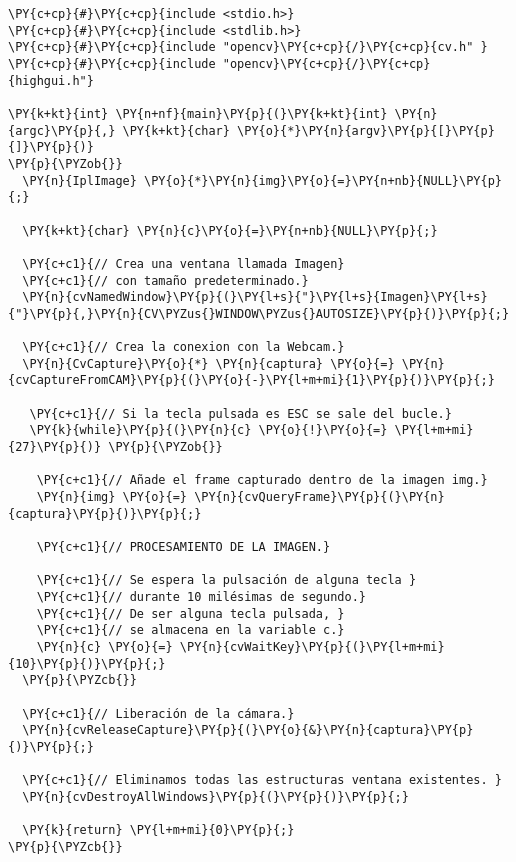 \begin{Verbatim}[commandchars=\\\{\}]
\PY{c+cp}{#}\PY{c+cp}{include <stdio.h>}
\PY{c+cp}{#}\PY{c+cp}{include <stdlib.h>}
\PY{c+cp}{#}\PY{c+cp}{include "opencv}\PY{c+cp}{/}\PY{c+cp}{cv.h" }
\PY{c+cp}{#}\PY{c+cp}{include "opencv}\PY{c+cp}{/}\PY{c+cp}{highgui.h"}

\PY{k+kt}{int} \PY{n+nf}{main}\PY{p}{(}\PY{k+kt}{int} \PY{n}{argc}\PY{p}{,} \PY{k+kt}{char} \PY{o}{*}\PY{n}{argv}\PY{p}{[}\PY{p}{]}\PY{p}{)}
\PY{p}{\PYZob{}}
  \PY{n}{IplImage} \PY{o}{*}\PY{n}{img}\PY{o}{=}\PY{n+nb}{NULL}\PY{p}{;}

  \PY{k+kt}{char} \PY{n}{c}\PY{o}{=}\PY{n+nb}{NULL}\PY{p}{;}

  \PY{c+c1}{// Crea una ventana llamada Imagen}
  \PY{c+c1}{// con tamaño predeterminado.}
  \PY{n}{cvNamedWindow}\PY{p}{(}\PY{l+s}{"}\PY{l+s}{Imagen}\PY{l+s}{"}\PY{p}{,}\PY{n}{CV\PYZus{}WINDOW\PYZus{}AUTOSIZE}\PY{p}{)}\PY{p}{;}
 
  \PY{c+c1}{// Crea la conexion con la Webcam.}
  \PY{n}{CvCapture}\PY{o}{*} \PY{n}{captura} \PY{o}{=} \PY{n}{cvCaptureFromCAM}\PY{p}{(}\PY{o}{-}\PY{l+m+mi}{1}\PY{p}{)}\PY{p}{;}
 
   \PY{c+c1}{// Si la tecla pulsada es ESC se sale del bucle.}
   \PY{k}{while}\PY{p}{(}\PY{n}{c} \PY{o}{!}\PY{o}{=} \PY{l+m+mi}{27}\PY{p}{)} \PY{p}{\PYZob{}} 

    \PY{c+c1}{// Añade el frame capturado dentro de la imagen img.}
    \PY{n}{img} \PY{o}{=} \PY{n}{cvQueryFrame}\PY{p}{(}\PY{n}{captura}\PY{p}{)}\PY{p}{;}

    \PY{c+c1}{// PROCESAMIENTO DE LA IMAGEN.}
  
    \PY{c+c1}{// Se espera la pulsación de alguna tecla }
    \PY{c+c1}{// durante 10 milésimas de segundo.}
    \PY{c+c1}{// De ser alguna tecla pulsada, }
    \PY{c+c1}{// se almacena en la variable c.}
    \PY{n}{c} \PY{o}{=} \PY{n}{cvWaitKey}\PY{p}{(}\PY{l+m+mi}{10}\PY{p}{)}\PY{p}{;}
  \PY{p}{\PYZcb{}}

  \PY{c+c1}{// Liberación de la cámara.}
  \PY{n}{cvReleaseCapture}\PY{p}{(}\PY{o}{&}\PY{n}{captura}\PY{p}{)}\PY{p}{;}

  \PY{c+c1}{// Eliminamos todas las estructuras ventana existentes. }
  \PY{n}{cvDestroyAllWindows}\PY{p}{(}\PY{p}{)}\PY{p}{;} 
   
  \PY{k}{return} \PY{l+m+mi}{0}\PY{p}{;}
\PY{p}{\PYZcb{}}
\end{Verbatim}
